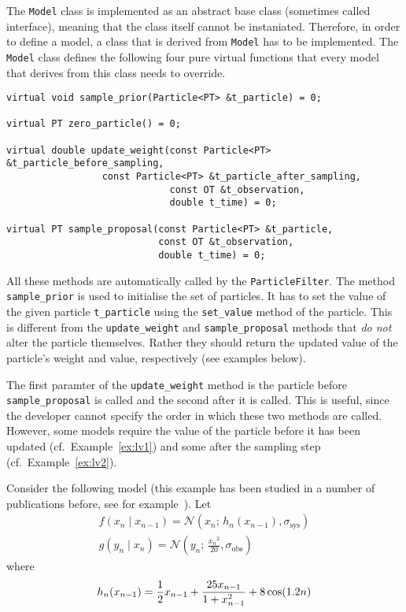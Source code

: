 The \texttt{Model} class is implemented as an abstract base class
(sometimes called interface), meaning that the class itself cannot be
instaniated. Therefore, in order to define a model, a class that is
derived from \texttt{Model} has to be implemented. The \texttt{Model}
class defines the following four pure virtual functions that every
model that derives from this class needs to override.
\begin{verbatim}
virtual void sample_prior(Particle<PT> &t_particle) = 0;

virtual PT zero_particle() = 0;

virtual double update_weight(const Particle<PT> &t_particle_before_sampling,
			     const Particle<PT> &t_particle_after_sampling,
                             const OT &t_observation,
                             double t_time) = 0;

virtual PT sample_proposal(const Particle<PT> &t_particle,
                           const OT &t_observation,
                           double t_time) = 0;
\end{verbatim}

All these methods are automatically called by the
\texttt{ParticleFilter}. The method \texttt{sample\_prior} is used to
initialise the set of particles. It has to set the value of the given
particle \texttt{t\_particle} using the \texttt{set\_value} method of
the particle. This is different from the \texttt{update\_weight} and
\texttt{sample\_proposal} methods that \emph{do not} alter the
particle themselves. Rather they should return the updated value of
the particle's weight and value, respectively (see examples below).

The first paramter of the \texttt{update\_weight} method is the
particle before \texttt{sample\_proposal} is called and the second
after it is called. This is useful, since the developer cannot specify
the order in which these two methods are called. However, some models
require the value of the particle before it has been updated (cf.\
Example~\ref{ex:lv1}) and some after the sampling step (cf.\
Example~\ref{ex:lv2}).

\begin{example}
  Consider the following model (this example has been studied in a
  number of publications before, see for
  example~\cite{arulampalam,gordon,kitagawa}). Let
  \begin{gather*}
    f(x_n \mid x_{n-1}) = \mathcal{N}(x_n;\, h_n(x_{n-1}), \sigma_{\text{sys}})\\
    g(y_n \mid x_n) = \mathcal{N}(y_n;\, \frac{{x_n}^2}{20},
    \sigma_{\text{obs}})
  \end{gather*}
  where
  \[
    h_n(x_{n-1}) = \frac{1}{2}x_{n-1} + \frac{25 x_{n-1}}{1 + x_{n-1}^2} + 8 \cos(1.2n) \\
  \]
\end{example}

\begin{example}\label{ex:lv1}
\end{example}

\begin{example}\label{ex:lv2}
  
\end{example}

